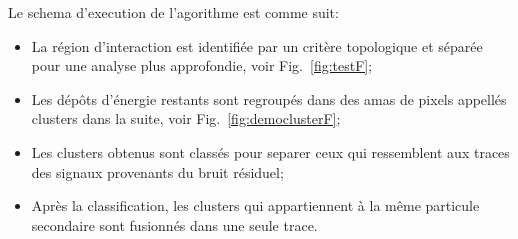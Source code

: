 Le schema d'execution de l'agorithme est comme suit:
\begin{itemize}
	\item La région d'interaction est identifiée par un critère topologique et séparée pour une analyse plus approfondie, voir Fig.~\ref{fig:testF};
	\item Les dépôts d'énergie restants sont regroupés dans des amas de pixels appellés  clusters dans la suite, voir Fig.~\ref{fig:democlusterF};
	\item Les clusters obtenus sont classés pour separer ceux qui ressemblent aux traces des signaux provenants du bruit résiduel; 
	\item Après la classification, les clusters qui appartiennent à la même particule secondaire   sont fusionnés dans une seule trace.
	
\end{itemize}
